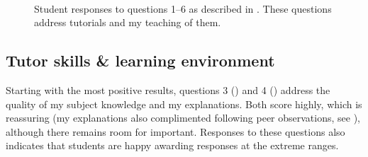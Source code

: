 \begin{figure}
    \quad
    \\
\caption{Student responses to questions 1--6 as described in . These questions address tutorials and my teaching of them.}
  \label{fig:plot-A}
\end{figure}

\subsection{Tutor skills \& learning environment}\label{sec:tutor-plus}

Starting with the most positive results, questions 3 () and 4 () address the quality of my subject knowledge and my explanations. Both score highly, which is reassuring (my explanations also complimented following peer observations, see ), although there remains room for important. Responses to these questions also indicates that students are happy awarding responses at the extreme ranges.

